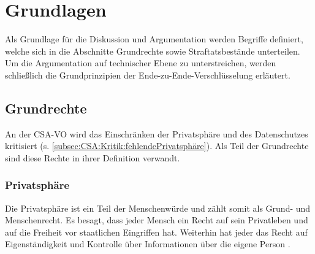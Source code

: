 \chapter{Grundlagen} %
\label{ch:Grundlagen}

Als Grundlage für die Diskussion und Argumentation werden Begriffe definiert, welche sich in die  Abschnitte Grundrechte sowie Straftatsbestände unterteilen. Um die Argumentation auf technischer Ebene zu unterstreichen, werden schließlich die Grundprinzipien der Ende-zu-Ende-Verschlüsselung erläutert.

\section{Grundrechte}
\label{sec:Grundlagen:DefGrundrechte}

An der \ac{CSA-VO} wird das Einschränken der Privatsphäre und des Datenschutzes kritisiert (s. \autoref{subsec:CSA:Kritik:fehlendePrivatsphäre}). Als Teil der Grundrechte sind diese Rechte in ihrer Definition verwandt.

\subsection*{Privatsphäre}      %
\label{subsec:Grundlagen:DefPrivatsphäre}

Die Privatsphäre ist ein Teil der Menschenwürde und zählt somit als Grund- und Menschenrecht. Es besagt, dass jeder Mensch ein Recht auf sein Privatleben und auf die Freiheit vor staatlichen Eingriffen hat. Weiterhin hat jeder das Recht auf Eigenständigkeit und Kontrolle über Informationen über die eigene Person \cite{edps:datenschutz, eu_charta_der_grundrechte}.

